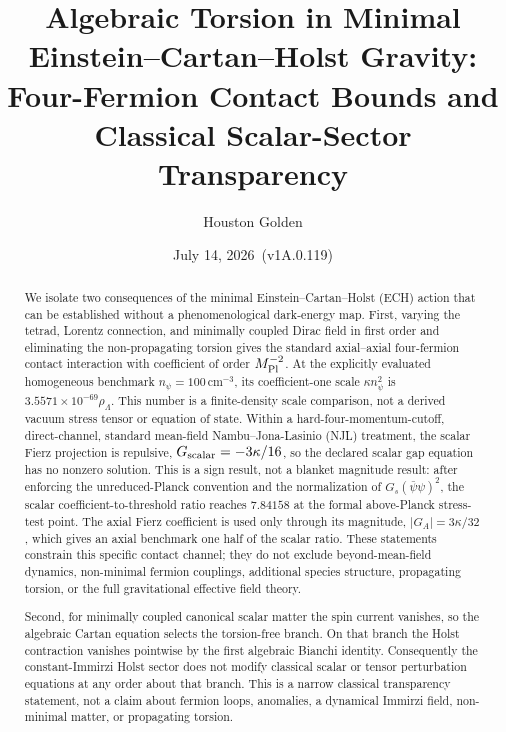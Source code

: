 \documentclass[aps,prd,twocolumn,superscriptaddress,showpacs,preprintnumbers,nofootinbib,longbibliography,floatfix]{revtex4-2}
\newcommand{\paperVersion}{v1A.0.119}
\newcommand{\paperTimestamp}{July 14, 2026}
\begin{document}

\title{Algebraic Torsion in Minimal Einstein--Cartan--Holst Gravity:\\
Four-Fermion Contact Bounds and Classical Scalar-Sector Transparency}

\author{Houston Golden}

\date{\paperTimestamp\ (\paperVersion)}

\begin{abstract}
We isolate two consequences of the minimal Einstein--Cartan--Holst (ECH)
action that can be established without a phenomenological dark-energy map.
First, varying the tetrad, Lorentz connection, and minimally coupled Dirac
field in first order and eliminating the non-propagating torsion gives the
standard axial--axial four-fermion contact interaction with coefficient of
order $M_{\rm Pl}^{-2}$.  At the explicitly evaluated homogeneous benchmark
$n_\psi=100\,\mathrm{cm}^{-3}$, its coefficient-one scale
$\kappa n_\psi^2$ is $3.5571\times10^{-69}\rho_\Lambda$.  This number is a
finite-density scale comparison, not a derived vacuum stress tensor or
equation of state.  Within a
hard-four-momentum-cutoff, direct-channel, standard mean-field
Nambu--Jona-Lasinio (NJL) treatment, the scalar Fierz projection is repulsive,
$G_{\rm scalar}=-3\kappa/16$, so the declared scalar gap equation has no
nonzero solution.  This is a sign result, not a blanket magnitude result:
after enforcing the unreduced-Planck convention and the normalization of
$G_s(\bar\psi\psi)^2$, the scalar coefficient-to-threshold ratio reaches
$7.84158$ at the formal above-Planck stress-test point.  The axial Fierz
coefficient is used only through its magnitude, $|G_A|=3\kappa/32$, which gives
an axial benchmark one half of the scalar ratio.  These statements constrain
this specific contact channel; they do not exclude beyond-mean-field dynamics,
non-minimal fermion couplings, additional species structure, propagating
torsion, or the full gravitational effective field theory.

Second, for minimally coupled canonical scalar matter the spin current
vanishes, so the algebraic Cartan equation selects the torsion-free branch.
On that branch the Holst contraction vanishes pointwise by the first
algebraic Bianchi identity.  Consequently the constant-Immirzi Holst sector
does not modify classical scalar or tensor perturbation equations at any
order about that branch.  This is a narrow classical transparency statement,
not a claim about fermion loops, anomalies, a dynamical Immirzi field,
non-minimal matter, or propagating torsion.


\end{abstract}
\end{document}
